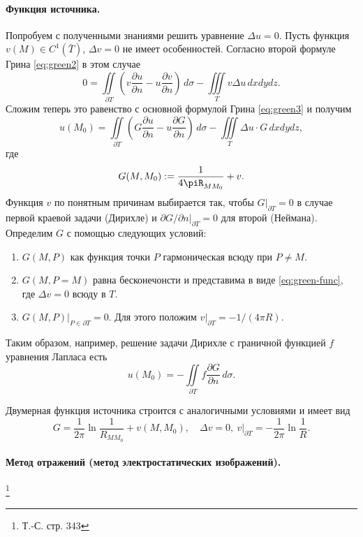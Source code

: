 \paragraph{Функция источника.} Попробуем с полученными знаниями решить уравнение $ \Delta u  = 0 $. Пусть функция $ v(M) \in C^1(\bar T) $, $ \Delta v = 0 $ не имеет особенностей.
Согласно второй формуле Грина \eqref{eq:green2} в этом случае 
\[
  0 = \iint\limits_{\partial T} \left( v \frac{\partial u}{\partial n} - u
  \frac{\partial v}{\partial n} \right) \,d\sigma - \iiint\limits_T v\Delta
  u\,dxdydz. 
\]
Сложим теперь это равенство с основной формулой Грина \eqref{eq:green3}  и
получим 
\[
  u(M_0) = \iint\limits_{\partial T} \left( G \frac{\partial u}{\partial n} - u
  \frac{\partial G}{\partial n}\right) \,d\sigma - \iiint\limits_T \Delta u
  \cdot G\,dxdydz,
\]
где 
\begin{equation}\label{eq:green-func}
  G(M, M_0) := \frac{1}{4\piR_{MM_0}} + v.
\end{equation}
Функция $ v $ по понятным причинам выбирается так, чтобы $ G|_{\partial T} = 0 $ в случае первой
краевой задачи (Дирихле) и $ \partial G/\partial n |_{\partial T} = 0 $ для
второй (Неймана). Определим $ G $ с помощью следующих условий:
\begin{enumerate}
  \item $G(M, P)$ как функция точки $ P $ гармоническая всюду при $ P \neq M $.
  \item $ G(M, P = M) $ равна бесконечонсти и представима в виде
    \eqref{eq:green-func}, где $ \Delta v = 0 $ всюду в $ T $.
  \item $ G(M, P)|_{P\in\partial T} = 0 $. Для этого положим $ v|_{\partial T} =
    -1/(4\pi R)$.
\end{enumerate}
Таким образом, например, решение задачи Дирихле с граничной функцией $ f $
уравнения Лапласа есть 
\[
  u(M_0) = - \iint\limits_{\partial T} f \frac{\partial G}{\partial n}\,d\sigma.
\]

Двумерная функция источника строится с аналогичными условиями и имеет вид 
\[
  G = \frac{1}{2\pi} \ln \frac{1}{R_{MM_0}} + v(M, M_0), \quad \Delta v = 0, \
  v|_{\partial T} = - \frac{1}{2\pi} \ln \frac{1}{R}.
\]



\paragraph{Метод отражений (метод электростатических изображений).}\footnote{Т.-С. стр. 343}

